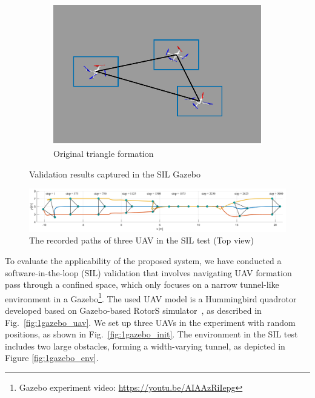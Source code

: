 \begin{figure}[!]
\begin{subfigure}[b]{0.48\textwidth}
    \includegraphics[width=\textwidth]{paper2/images/gazebo_res6.pdf}
    \caption{Original triangle formation}
    \label{fig:1gazebo_6}
    \end{subfigure}
    \caption{Validation results captured in the SIL Gazebo}
    \label{fig:1gazebo_result}
\end{figure}

\begin{figure}[!]
    \centering
    \includegraphics[width=\textwidth]{paper2/images/gazebo_path.pdf}
    \caption{The recorded paths of three UAV in the SIL test (Top view)}
    \label{fig:1gazebo_path}
\end{figure}

To evaluate the applicability of the proposed system, we have conducted a software-in-the-loop (SIL) validation that involves navigating UAV formation pass through a confined space, which only focuses on a narrow tunnel-like environment in a Gazebo\footnote{Gazebo experiment video: {\selectfont
\url{https://youtu.be/AIAAzRiIepg}}}. The used UAV model is a Hummingbird quadrotor developed based on Gazebo-based RotorS simulator~\cite{Furrer2016}, as described in Fig.~\ref{fig:1gazebo_uav}. We set up three UAVs in the experiment with random positions, as shown in Fig.~\ref{fig:1gazebo_init}. The environment in the SIL test includes two large obstacles, forming a width-varying tunnel, as depicted in Figure \ref{fig:1gazebo_env}.

